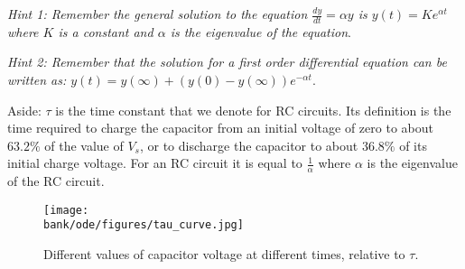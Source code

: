\begin{enumerate}
\textit{Hint 1: Remember the general solution to the equation $\frac{dy}{dt}=\alpha y$ is 
$y(t)=Ke^{\alpha t}$ where $K$ is a constant and $\alpha$ is the eigenvalue of the equation}.

\textit{Hint 2: Remember that the solution for a first order differential equation 
can be written as: $y(t) = y(\infty) + (y(0) - y(\infty)) e^{-\alpha t}$}.


\end{enumerate}

Aside: $\tau$ is the time constant that we denote for RC circuits. 
Its definition is the time required to charge the capacitor from an initial voltage of zero to about $63.2\%$ of the value of $V_s$, 
or to discharge the capacitor to about $36.8\%$ of its initial charge voltage. For an RC circuit it is equal to $\frac{1}{\alpha}$ 
where $\alpha$ is the eigenvalue of the RC circuit.


\begin{figure}[!h]
  \centering
  \texttt{[image: \\bank/ode/figures/tau\_curve.jpg]}
  \caption{Different values of capacitor voltage at different times, relative to $\tau.$}
  \label{fig:Tau Curve for Charging RC Circuit}
\end{figure}

